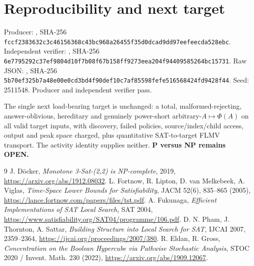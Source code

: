 \documentclass[11pt]{article}
\begin{document}
\section{Reproducibility and next target}
Producer:
, SHA-256
\texttt{fccf2383632c3c46156368c43bc968a26455f35d0dcad9dd97eefeecda528ebc}.
Independent verifier:
, SHA-256
\texttt{6e7795292c37ef9804d10f7b08f67b158ff9273eea204f94409585264bc15731}.
Raw JSON:
,
SHA-256 \texttt{5b70ef325b7a48e00e0cd3bd4f90def10c7af85598fefe516568424fd9428f44}.
Seed: 2511548.  Producer and independent verifier pass.

The single next load-bearing target is unchanged: a total, malformed-rejecting,
answer-oblivious, hereditary and genuinely power-short arbitrary-$A\mapsto\Phi(A)$ on
all valid target inputs, with discovery, failed policies, source/index/child access,
output and peak space charged, plus quantitative SAT-to-target FLMV transport.  The
activity identity supplies neither.  \textbf{P versus NP remains OPEN.}

\begin{thebibliography}{9}
 J. D\"ocker, \emph{Monotone 3-Sat-(2,2) is NP-complete}, 2019,
\url{https://arxiv.org/abs/1912.08032}.
 L. Fortnow, R. Lipton, D. van Melkebeek, A. Viglas,
\emph{Time-Space Lower Bounds for Satisfiability}, JACM 52(6), 835--865 (2005),
\url{https://lance.fortnow.com/papers/files/tst.pdf}.
 A. Fukunaga, \emph{Efficient Implementations of SAT Local Search},
SAT 2004, \url{https://www.satisfiability.org/SAT04/programme/106.pdf}.
 D. N. Pham, J. Thornton, A. Sattar, \emph{Building Structure into Local
Search for SAT}, IJCAI 2007, 2359--2364,
\url{https://ijcai.org/proceedings/2007/380}.
 R. Eldan, R. Gross, \emph{Concentration on the Boolean Hypercube via
Pathwise Stochastic Analysis}, STOC 2020 / Invent. Math. 230 (2022),
\url{https://arxiv.org/abs/1909.12067}.
\end{thebibliography}
\end{document}
